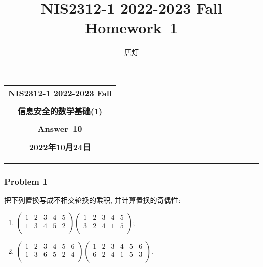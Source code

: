 \documentclass[a4paper,12pt]{ctexart}
\title{NIS2312-1 2022-2023 Fall Homework~1}
\author{唐灯}
\begin{document}
  \begin{center}

  \vspace{-0.3in}
  \begin{tabular}{c}
    \textbf{\Large NIS2312-1 2022-2023 Fall} \\
    \textbf{\Large  } \\
    \textbf{\Large  信息安全的数学基础(1)} \\
    \textbf{\Large  } \\
    \textbf{\Large  Answer~10} \\
    \textbf{\Large  } \\
    \textbf{\Large 2022年10月24日} \\
  \end{tabular}
  \end{center}
  \noindent
  \rule{\linewidth}{0.4pt}
  

\subsubsection*{Problem 1}
  把下列置换写成不相交轮换的乘积, 并计算置换的奇偶性:
  \begin{enumerate}[label=(\arabic{*})]
    \item  $\begin{pmatrix}
      1 &2 &3 &4 &5 \\
      1 &3 &4 &5 &2 \\
    \end{pmatrix}\begin{pmatrix}
      1 &2 &3 &4 &5 \\
      3 &2 &4 &1 &5 \\
    \end{pmatrix};$
    \item $\begin{pmatrix}
      1 &2 &3 &4 &5 &6\\
      1 &3 &6 &5 &2 &4\\
    \end{pmatrix}\begin{pmatrix}
      1 &2 &3 &4 &5 &6\\
      6 &2 &4 &1 &5 &3\\
    \end{pmatrix}.$
  \end{enumerate}
  
\end{document}
